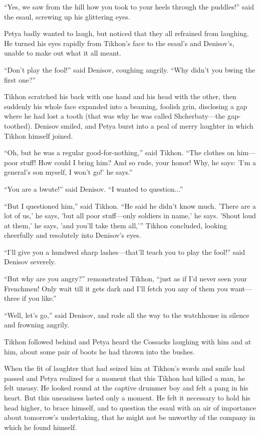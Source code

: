 ``Yes, we saw from the hill how you took to your heels through
the puddles!'' said the esaul, screwing up his glittering eyes.

Petya badly wanted to laugh, but noticed that they all refrained
from laughing. He turned his eyes rapidly from Tikhon's face to
the esaul's and Denisov's, unable to make out what it all meant.

``Don't play the fool!'' said Denisov, coughing angrily. ``Why
didn't you bwing the first one?''

Tikhon scratched his back with one hand and his head with the
other, then suddenly his whole face expanded into a beaming,
foolish grin, disclosing a gap where he had lost a tooth (that
was why he was called Shcherbaty---the gap-toothed). Denisov
smiled, and Petya burst into a peal of merry laughter in which
Tikhon himself joined.

``Oh, but he was a regular good-for-nothing,'' said Tikhon. ``The
clothes on him---poor stuff! How could I bring him? And so rude,
your honor! Why, he says: 'I'm a general's son myself, I won't
go!' he says.''

``You are a bwute!'' said Denisov. ``I wanted to question...''

``But I questioned him,'' said Tikhon. ``He said he didn't know
much.  'There are a lot of us,' he says, 'but all poor
stuff---only soldiers in name,' he says. 'Shout loud at them,' he
says, 'and you'll take them all,'{}'' Tikhon concluded, looking
cheerfully and resolutely into Denisov's eyes.

``I'll give you a hundwed sharp lashes---that'll teach you to
play the fool!'' said Denisov severely.

``But why are you angry?'' remonstrated Tikhon, ``just as if I'd
never seen your Frenchmen! Only wait till it gets dark and I'll
fetch you any of them you want---three if you like.''

``Well, let's go,'' said Denisov, and rode all the way to the
watchhouse in silence and frowning angrily.

Tikhon followed behind and Petya heard the Cossacks laughing with
him and at him, about some pair of boots he had thrown into the
bushes.

When the fit of laughter that had seized him at Tikhon's words
and smile had passed and Petya realized for a moment that this
Tikhon had killed a man, he felt uneasy. He looked round at the
captive drummer boy and felt a pang in his heart. But this
uneasiness lasted only a moment. He felt it necessary to hold his
head higher, to brace himself, and to question the esaul with an
air of importance about tomorrow's undertaking, that he might not
be unworthy of the company in which he found himself.


